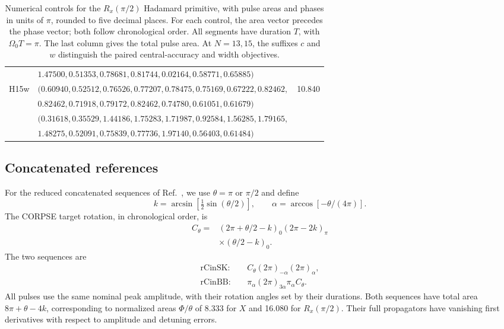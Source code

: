 \documentclass[10pt,aps,twocolumn,pra,floatfix,superscriptaddress]{revtex4-2}
\begin{document}
\begin{table}[tp]
\begin{ruledtabular}
\begin{tabular}{llr}
 & $1.47500,0.51353,0.78681,0.81744,0.02164,0.58771,0.65885)$ &  \\
H15w & $(0.60940,0.52512,0.76526,0.77207,0.78475,0.75169,0.67222,0.82462,$ & 10.840 \\
 & $0.82462,0.71918,0.79172,0.82462,0.74780,0.61051,0.61679)$ &  \\
 & $(0.31618,0.35529,1.44186,1.75283,1.71987,0.92584,1.56285,1.79165,$ &  \\
 & $1.48275,0.52091,0.75839,0.77736,1.97140,0.56403,0.61484)$ &  \\
\end{tabular}
\end{ruledtabular}
\caption{Numerical controls for the $R_x(\pi/2)$ Hadamard primitive, with pulse areas and phases in units of $\pi$, rounded to five decimal places. For each control, the area vector precedes the phase vector; both follow chronological order. All segments have duration $T$, with $\Omega_0T=\pi$. The last column gives the total pulse area. At $N=13,15$, the suffixes $c$ and $w$ distinguish the paired central-accuracy and width objectives.}
\label{table: params}
\end{table}


\subsection{Concatenated references}
\label{app:reference_controls}

For the reduced concatenated sequences of Ref.~\cite{Bando_2013},
we use $\theta=\pi$ or $\pi/2$ and define
\begin{equation}
k=\arcsin[\tfrac12\sin(\theta/2)],\qquad
\alpha=\arccos[-\theta/(4\pi)].
\end{equation}
The CORPSE target rotation, in chronological order, is
\begin{align}
C_\theta={}&(2\pi+\theta/2-k)_0(2\pi-2k)_\pi\nonumber\\
&\times(\theta/2-k)_0.
\end{align}
The two sequences are
\begin{align}
\mathrm{rCinSK}:&\quad C_\theta(2\pi)_{-\alpha}(2\pi)_\alpha,\\
\mathrm{rCinBB}:&\quad\pi_\alpha(2\pi)_{3\alpha}\pi_\alpha C_\theta.
\end{align}
All pulses use the same nominal peak amplitude, with their rotation
angles set by their durations. Both sequences have total area
$8\pi+\theta-4k$, corresponding to normalized areas $\Phi/\theta$
of 8.333 for $X$ and 16.080 for $R_x(\pi/2)$. Their full propagators
have vanishing first derivatives with respect to amplitude and
detuning errors.
\end{document}
